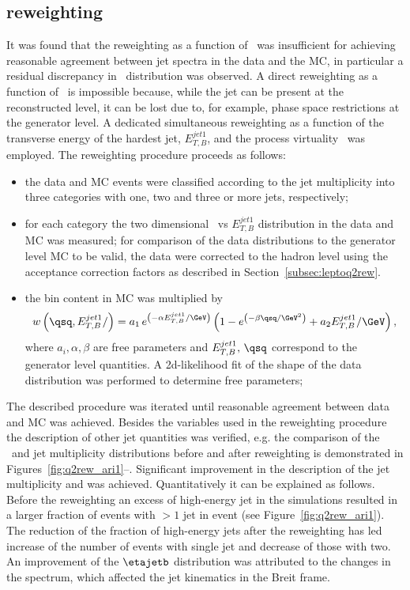 \subsection{\ariadne reweighting}
\label{subsec:ariadneq2rew}
It was found that the reweighting as a function of \qsq~was insufficient for achieving reasonable agreement between jet spectra in the data and the \ariadne MC, in particular a residual discrepancy in \etjetb~distribution was observed. A direct reweighting as a function of \etjetb~is impossible because, while the jet can be present at the reconstructed level, it can be lost due to, for example, phase space restrictions at the generator level. A dedicated simultaneous reweighting as a function of the transverse energy of the hardest jet, $E_{T,B}^{jet1}$, and the process virtuality \qsq~was employed. The reweighting procedure proceeds as follows:
\begin{itemize}
	\item the data and MC events were classified according to the jet multiplicity into three categories with one, two and three or more jets, respectively;
	\item for each category the two dimensional \qsq~vs $E_{T,B}^{jet1}$ distribution in the data and MC was measured; for comparison of the data distributions to the generator level MC to be valid, the data were corrected to the hadron level using the acceptance correction factors as described in Section~\ref{subsec:leptoq2rew}.
	\item the bin content in MC was multiplied by 
	\begin{equation}
		w\left( \qsq, E_{T,B}^{jet1}/ \right)=a_1\,e^{\left( -\alpha E_{T,B}^{jet1}/\GeV\right) }\left(1- e^{\left( -\beta\qsq/\GeV^2\right) } + a_2 E_{T,B}^{jet1}/\GeV \right),
		\end{equation}
where $a_i, \alpha, \beta$ are free parameters and $E_{T,B}^{jet1},\,\qsq$ correspond to the generator level quantities. A 2d-likelihood fit of the shape of the data distribution was performed to determine free parameters;
\end{itemize}
The described procedure was iterated until reasonable agreement between data and MC was achieved. Besides the variables used in the reweighting procedure the description of other jet quantities was verified, e.g. the comparison of the \etajetb~and jet multiplicity distributions before and after reweighting is demonstrated in Figures~\ref{fig:q2rew_ari1}--. Significant improvement in the description of the jet multiplicity and \etajetb was achieved. Quantitatively it can be explained as follows. Before the reweighting an excess of high-energy jet in the simulations resulted in a larger fraction of events with $> 1$ jet in event (see Figure~\ref{fig:q2rew_ari1}). The reduction of the fraction of high-energy jets after the reweighting has led increase of the number of events with single jet and decrease of those with two. An improvement of the $\etajetb$ distribution was attributed to the changes in the \qsq spectrum, which affected the jet kinematics in the Breit frame.

